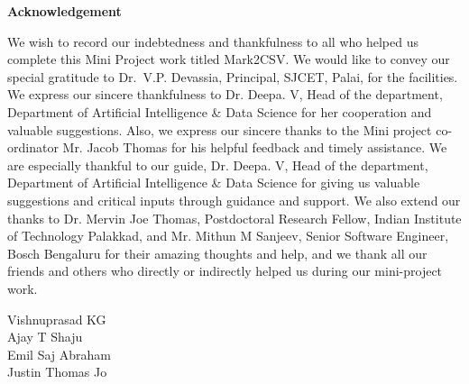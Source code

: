 \thispagestyle{empty}
\begin{center}
  \vspace*{1cm}
  \textbf{\large Acknowledgement}
\end{center}
We wish to record our indebtedness and thankfulness to all who helped us complete this Mini Project work titled Mark2CSV. We would like to convey our special gratitude to Dr.~V.P. Devassia, Principal, SJCET, Palai, for the facilities. We express our sincere thankfulness to Dr. Deepa. V, Head of the department, Department of Artificial Intelligence \& Data Science for her cooperation and valuable suggestions. Also, we express our sincere thanks to the Mini project co-ordinator Mr. Jacob Thomas for his helpful feedback and timely assistance.
We are especially thankful to our guide, Dr. Deepa. V, Head of the department, Department of Artificial Intelligence \& Data Science for giving us valuable suggestions and critical inputs through guidance and support. We also extend our thanks to Dr. Mervin Joe Thomas, Postdoctoral Research Fellow, Indian Institute of Technology Palakkad, and Mr. Mithun M Sanjeev, Senior Software Engineer, Bosch Bengaluru for their amazing thoughts and help, and we thank all our friends and others who directly or indirectly helped us during our mini-project work.
 \\
\begin{flushright}
Vishnuprasad KG \\
Ajay T Shaju \\
Emil Saj Abraham \\
Justin Thomas Jo
\end{flushright}



\newpage
\thispagestyle{empty}

\clearpage
